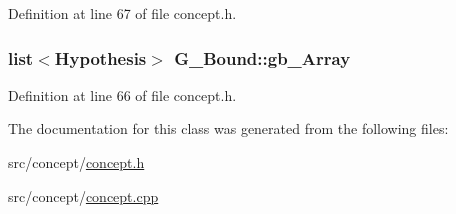 Definition at line 67 of file concept.\-h.

\hypertarget{class_g___bound_ace60790dcb7f10a2caa157abe1aa838f}{
\subsubsection[{gb\-\_\-\-Array}]{\setlength{\rightskip}{0pt plus 5cm}list$<${\bf Hypothesis}$>$ G\-\_\-\-Bound\-::gb\-\_\-\-Array\hspace{0.3cm}{\ttfamily [private]}}}\label{class_g___bound_ace60790dcb7f10a2caa157abe1aa838f}


Definition at line 66 of file concept.\-h.



The documentation for this class was generated from the following files\-:\begin{DoxyCompactItemize}
\item 
src/concept/\hyperlink{concept_8h}{concept.\-h}\item 
src/concept/\hyperlink{concept_8cpp}{concept.\-cpp}\end{DoxyCompactItemize}
